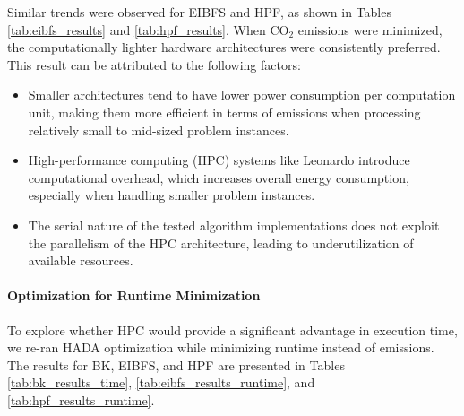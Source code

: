 \documentclass[a4paper,singleside,12pt]{report} %
\begin{document}
Similar trends were observed for EIBFS and HPF, as shown in Tables \ref{tab:eibfs_results} and \ref{tab:hpf_results}. When CO$_2$ emissions were minimized, the computationally
lighter hardware architectures were consistently preferred. This result can be attributed to the following factors:

\begin{itemize}
    \item Smaller architectures tend to have lower power consumption per computation unit, making them more efficient in terms of emissions when processing relatively small to mid-sized problem instances.
    \item High-performance computing (HPC) systems like Leonardo introduce computational overhead, which increases overall energy consumption, especially when handling smaller problem instances.
    \item The serial nature of the tested algorithm implementations does not exploit the parallelism of the HPC architecture, leading to underutilization of available resources.
\end{itemize}

\paragraph{Optimization for Runtime Minimization}

To explore whether HPC would provide a significant advantage in execution time, we re-ran HADA optimization while minimizing runtime instead of emissions. The results for BK, EIBFS, 
and HPF are presented in Tables \ref{tab:bk_results_time}, \ref{tab:eibfs_results_runtime}, and \ref{tab:hpf_results_runtime}.
\end{document}
